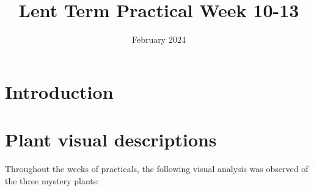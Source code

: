 \documentclass[a4]{article}
\title{Lent Term Practical Week 10-13}
\author{}
\date{February 2024}
\begin{document}
	\maketitle
	\tableofcontents
	\section{Introduction}
	
	\section{Plant visual descriptions}
	
	Throughout the weeks of practicals, the following visual analysis was observed of the three mystery plants:

\end{document}
